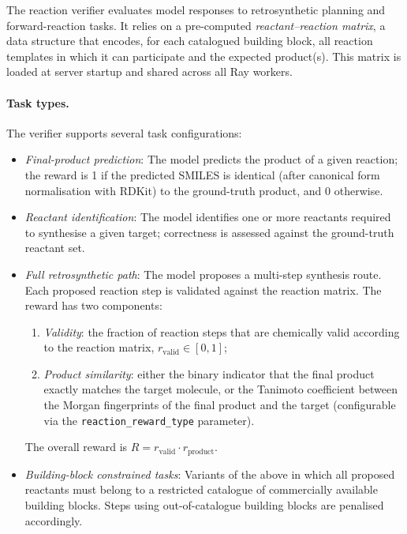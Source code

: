 The reaction verifier evaluates model responses to retrosynthetic planning
and forward-reaction tasks.  It relies on a pre-computed
\textit{reactant–reaction matrix}, a data structure that encodes, for each
catalogued building block, all reaction templates in which it can participate
and the expected product(s).  This matrix is loaded at server startup and
shared across all Ray workers.

\paragraph{Task types.}
The verifier supports several task configurations:

\begin{itemize}
  \item \textit{Final-product prediction}: The model predicts the product of a
        given reaction; the reward is 1 if the predicted SMILES is identical
        (after canonical form normalisation with RDKit) to the ground-truth
        product, and 0 otherwise.
  \item \textit{Reactant identification}: The model identifies one or more
        reactants required to synthesise a given target; correctness is
        assessed against the ground-truth reactant set.
  \item \textit{Full retrosynthetic path}: The model proposes a multi-step
        synthesis route.  Each proposed reaction step is validated against the
        reaction matrix.  The reward has two components:
        \begin{enumerate}
          \item \emph{Validity}: the fraction of reaction steps that are
                chemically valid according to the reaction matrix,
                $r_{\text{valid}} \in [0, 1]$;
          \item \emph{Product similarity}: either the binary indicator that the
                final product exactly matches the target molecule, or the
                Tanimoto coefficient between the Morgan fingerprints of the
                final product and the target
                (configurable via the \texttt{reaction\_reward\_type}
                parameter).
        \end{enumerate}
        The overall reward is $R = r_{\text{valid}} \cdot r_{\text{product}}$.
  \item \textit{Building-block constrained tasks}: Variants of the above in
        which all proposed reactants must belong to a restricted catalogue of
        commercially available building blocks.  Steps using out-of-catalogue
        building blocks are penalised accordingly.
\end{itemize}
